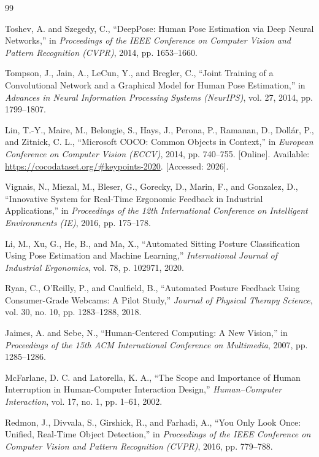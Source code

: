 \documentclass{llncs}
\begin{document}
\begin{thebibliography}{99}

Toshev, A. and Szegedy, C., ``DeepPose: Human Pose Estimation via Deep Neural Networks,'' in \textit{Proceedings of the IEEE Conference on Computer Vision and Pattern Recognition (CVPR)}, 2014, pp. 1653--1660.

Tompson, J., Jain, A., LeCun, Y., and Bregler, C., ``Joint Training of a Convolutional Network and a Graphical Model for Human Pose Estimation,'' in \textit{Advances in Neural Information Processing Systems (NeurIPS)}, vol. 27, 2014, pp. 1799--1807.

Lin, T.-Y., Maire, M., Belongie, S., Hays, J., Perona, P., Ramanan, D., Doll{\'a}r, P., and Zitnick, C. L., ``Microsoft COCO: Common Objects in Context,'' in \textit{European Conference on Computer Vision (ECCV)}, 2014, pp. 740--755. [Online]. Available: \url{https://cocodataset.org/#keypoints-2020}. [Accessed: 2026].

Vignais, N., Miezal, M., Bleser, G., Gorecky, D., Marin, F., and Gonzalez, D., ``Innovative System for Real-Time Ergonomic Feedback in Industrial Applications,'' in \textit{Proceedings of the 12th International Conference on Intelligent Environments (IE)}, 2016, pp. 175--178.

Li, M., Xu, G., He, B., and Ma, X., ``Automated Sitting Posture Classification Using Pose Estimation and Machine Learning,'' \textit{International Journal of Industrial Ergonomics}, vol. 78, p. 102971, 2020.

Ryan, C., O'Reilly, P., and Caulfield, B., ``Automated Posture Feedback Using Consumer-Grade Webcams: A Pilot Study,'' \textit{Journal of Physical Therapy Science}, vol. 30, no. 10, pp. 1283--1288, 2018.

Jaimes, A. and Sebe, N., ``Human-Centered Computing: A New Vision,'' in \textit{Proceedings of the 15th ACM International Conference on Multimedia}, 2007, pp. 1285--1286.

McFarlane, D. C. and Latorella, K. A., ``The Scope and Importance of Human Interruption in Human-Computer Interaction Design,'' \textit{Human--Computer Interaction}, vol. 17, no. 1, pp. 1--61, 2002.

Redmon, J., Divvala, S., Girshick, R., and Farhadi, A., ``You Only Look Once: Unified, Real-Time Object Detection,'' in \textit{Proceedings of the IEEE Conference on Computer Vision and Pattern Recognition (CVPR)}, 2016, pp. 779--788.


\end{thebibliography}
\end{document}
